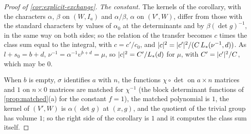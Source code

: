 \begin{proof}[Proof of \cref{cor:explicit-exchange}]
\emph{The constant.} The kernels of the corollary, with the characters $\alpha$, $\beta$ on $(W,I_a)$ and $\alpha/\beta$, $\alpha$ on $(V',W)$, differ from those with the standard characters by values of $\alpha_0$ at the determinants
and by $\beta(\det g)^{-1}$, in the same way on both sides; so the relation of the transfer becomes $c$ times the class sum equal to the integral, with $c=c'/c_0$, and $\lvert c\rvert^2=\lvert c'\rvert^2/(C\,L_*(\nu^{-1},d))$. As
$l+s_0=b+d$, $\nu^{-1}=\alpha^{-1}\upsilon^{b+d}=\mu$, so $\lvert c\rvert^2=C'/L_*(d)$ for $\mu$, with $C'=\lvert c'\rvert^2/C$, which may be $0$.

When $b$ is empty, $\sigma$ identifies $a$ with $n$, the functions $\chi\circ\det$ on $a\times n$ matrices and $1$ on $n\times0$ matrices are matched for $\chi^{-1}$ (the block determinant functions of \cref{prop:matched}(a) for the
constant $f=1$), the matched polynomial is $1$, the kernel of $(V',W)$ is $\alpha(\det g)$ at $(x,g)$, and the quotient of the trivial group has volume $1$; so the right side of the corollary is $1$ and it computes the class
sum itself.
\end{proof}
